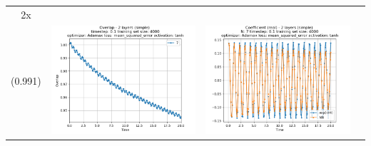 \documentclass{article}
\begin{document}
\begin{tabular}{|c|c|c|c|}
     2x \\ (0.991) &
     \includegraphics[scale=0.37]{./1,2,3x_longer_than_t_total/2_layers_simple_train_samples=4000_timestep=0.1_t_total=2x_optimizer=Adamax_loss=mean_squared_error_activation=tanh/Overlap.png} &
     \includegraphics[scale=0.37]{./1,2,3x_longer_than_t_total/2_layers_simple_train_samples=4000_timestep=0.1_t_total=2x_optimizer=Adamax_loss=mean_squared_error_activation=tanh/Coeff_N=7_(real).png} &

\end{tabular}
\end{document}
